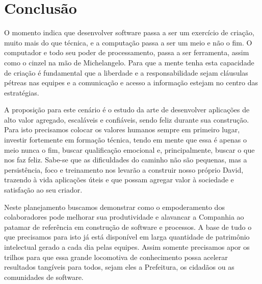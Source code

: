 \chapter{Conclusão}

O momento indica que desenvolver software passa a ser um exercício de criação, muito mais do que técnica, e a computação passa a ser um meio e não o fim. O computador e todo seu poder de processamento, passa a ser ferramenta, assim como o cinzel na mão de Michelangelo. Para que a mente tenha esta capacidade de criação é fundamental que a liberdade e a responsabilidade sejam cláusulas pétreas nas equipes e a comunicação e acesso a informação estejam no centro das estratégias.

A proposição para este cenário é o estudo da arte de desenvolver aplicações de alto valor agregado, escaláveis e confiáveis, sendo feliz durante sua construção. Para isto precisamos colocar os valores humanos sempre em primeiro lugar, investir fortemente em formação técnica, tendo em mente que essa é apenas o meio nunca o fim, buscar qualificação emocional e, principalmente, buscar o  que nos faz feliz. Sabe-se que as dificuldades do caminho não são pequenas, mas a persistência, foco e treinamento nos levarão a construir nosso próprio David, trazendo à vida aplicações úteis e que possam agregar valor à sociedade e satisfação ao seu criador.

Neste planejamento buscamos demonstrar como o empoderamento dos colaboradores pode melhorar sua produtividade e alavancar a Companhia ao patamar de referência em construção de software e processos. A base de tudo o que precisamos para isto já está disponível em larga quantidade de patrimônio intelectual gerado a cada dia pelas equipes. Assim somente precisamos apor os trilhos para que essa grande locomotiva de conhecimento possa acelerar resultados tangíveis para todos, sejam eles a Prefeitura, os cidadãos ou as comunidades de software.
